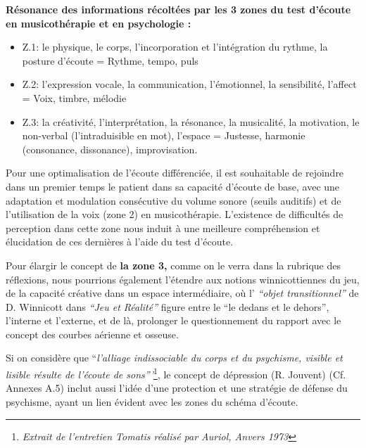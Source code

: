 


	\textbf{Résonance des informations récoltées par les 3
          zones du test d'écoute en musicothérapie et en
  psychologie :}

\begin{itemize}
 \item  Z.1: le physique, le corps, l'incorporation et
l'intégration du rythme,
la posture d'écoute  =  Rythme, tempo, puls

\item  Z.2:  l'expression vocale, la communication,
l'émotionnel, la sensibilité, l'affect = Voix, timbre, mélodie

\item Z.3: la créativité, l'interprétation, la
résonance, la musicalité, la motivation, le non-verbal (l'intraduisible en mot), l'espace = Justesse, harmonie (consonance,
dissonance), improvisation.
\end{itemize}


Pour une optimalisation de l'écoute différenciée, il est souhaitable
de rejoindre dans un premier temps  le patient dans sa capacité
d'écoute de base, avec une adaptation et modulation consécutive du
volume sonore (seuils auditifs) et de l'utilisation de la voix (zone
2) en musicothérapie.
L'existence de difficultés de perception dans cette zone nous
induit à une meilleure compréhension et  élucidation de ces dernières à l'aide du
test d'écoute.

Pour élargir le concept de\textbf{ la zone 3,} comme on le
verra dans la rubrique des réflexions, nous pourrions
également l'étendre aux notions winnicottiennes du jeu, de la capacité
créative dans un espace
intermédiaire, où l' \textit{``objet
transitionnel'' } de D. Winnicott dans \textit{``Jeu et Réalité''}
\autocite{winnicott}
figure entre le ``le
dedans et le
dehors'',
l'interne et l'externe, et de là,  prolonger le questionnement du
rapport avec le concept des
courbes aérienne et osseuse.



Si on considère que ``\emph{l'alliage indissociable du corps et du psychisme,
visible et lisible résulte de l'écoute de
sons'''}\footnote{\emph{Extrait de l'entretien Tomatis réalisé par
  Auriol, Anvers 1973}}, le concept de dépression (R. Jouvent) \autocite{doronparot} (Cf. Annexes
A.5) inclut aussi l'idée d'une protection et une stratégie de
défense du psychisme, ayant un lien évident avec les zones du schéma d'écoute.

